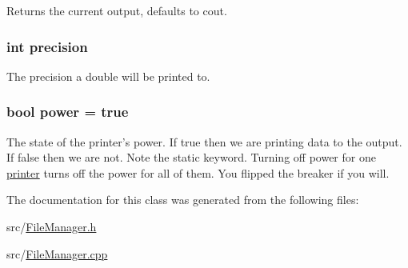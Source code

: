 Returns the current output, defaults to cout. \hypertarget{classJKBuilder_1_1IOManager_aa95455ed52a8459fad69509a4a0411b5}{
\subsubsection[{precision}]{\setlength{\rightskip}{0pt plus 5cm}int {\bf precision}}}
\label{classJKBuilder_1_1IOManager_aa95455ed52a8459fad69509a4a0411b5}


The precision a double will be printed to. \hypertarget{classJKBuilder_1_1IOManager_aababa9aef0d20ddcfce2d78f41ae1dd8}{
\subsubsection[{power}]{\setlength{\rightskip}{0pt plus 5cm}bool {\bf power} = true}}
\label{classJKBuilder_1_1IOManager_aababa9aef0d20ddcfce2d78f41ae1dd8}


The state of the printer's power. If true then we are printing data to the output. If false then we are not. Note the static keyword. Turning off power for one \hyperlink{classJKBuilder_1_1printer}{printer} turns off the power for all of them. You flipped the breaker if you will. 

The documentation for this class was generated from the following files:\begin{DoxyCompactItemize}
\item 
src/\hyperlink{FileManager_8h}{FileManager.h}\item 
src/\hyperlink{FileManager_8cpp}{FileManager.cpp}\end{DoxyCompactItemize}

